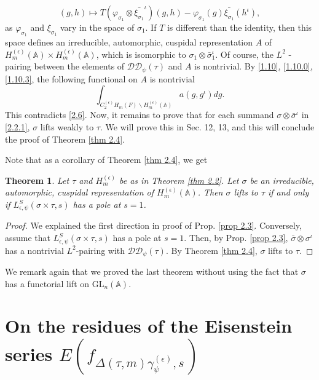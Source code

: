 \documentclass[12pts]{amsart}
\newcommand{\BA}{{\mathbb {A}}}
\newcommand{\GL}{{\mathrm{GL}}}
\newtheorem{thm}{Theorem}[section]
\begin{document}
$$
(g,h)\mapsto T(\varphi_{\sigma_1}\otimes \bar{\xi_{\sigma_1}}^\iota)(g,h)- \varphi_{\sigma_1}(g) \bar{\xi_{\sigma_1}}(h^\iota), 
$$
as $\varphi_{\sigma_1}$ and $\xi_{\sigma_1}$ vary in the space of $\sigma_1$. If $T$ is different than the identity, then this space defines an irreducible, automorphic, cuspidal representation $A$ of $H^{(\epsilon)}_m(\BA)\times H^{(\epsilon)}_m(\BA)$, which is isomorphic to $\sigma_1\otimes \bar{\sigma}_1^\iota$. Of course, the $L^2$ -  pairing between the elements of $\mathcal{D}\mathcal{D}_\psi(\tau)$ and $A$ is nontrivial. By \eqref{1.10}, \eqref{1.10.0}, \eqref{1.10.3},  the following functional on $A$ is nontrivial
$$
\int_{C_2^{(\epsilon)}H_m(F)\backslash H^{(\epsilon)}_m(\BA)}a(g,g^\iota)dg.
$$
This contradicts \eqref{2.6}. Now, it remains to prove that for each summand  $\sigma\otimes \bar{\sigma}^\iota$ in \eqref{2.2.1}, $\sigma$ lifts weakly to $\tau$. We will prove this in Sec. 12, 13, and this will conclude the proof of Theorem \ref{thm 2.4}. 

Note that as a corollary of Theorem \ref{thm 2.4}, we get 
\begin{thm}\label{thm 2.5}
Let $\tau$ and $H^{(\epsilon)}_m$ be as in Theorem \ref{thm 2.2}. Let $\sigma$ be an irreducible, automorphic, cuspidal representation of $H^{(\epsilon)}_m(\BA)$. Then $\sigma$ lifts to $\tau$ if and only if $L^S_{\epsilon,\psi}(\sigma\times\tau,s)$ has a pole at $s=1$.
\end{thm}
\begin{proof}
We explained the first direction in proof of Prop. \ref{prop 2.3}. Conversely, assume that $L^S_{\epsilon,\psi}(\sigma\times\tau,s)$ has a pole at $s=1$. Then, by Prop. \ref{prop 2.3}, $\bar{\sigma}\otimes\sigma^\iota$ has a nontrivial $L^2$-pairing with $\mathcal{D}\mathcal{D}_\psi(\tau)$. By Theorem \ref{thm 2.4}, $\sigma$ lifts to $\tau$.
\end{proof}
We remark again that we proved the last theorem without using the fact that $\sigma$ has a functorial lift on $\GL_n(\BA)$. 









\section{On the residues of the Eisenstein series $E(f_{\Delta(\tau,
		m)\gamma^{(\epsilon)}_\psi,s})$}
	
\end{document}
